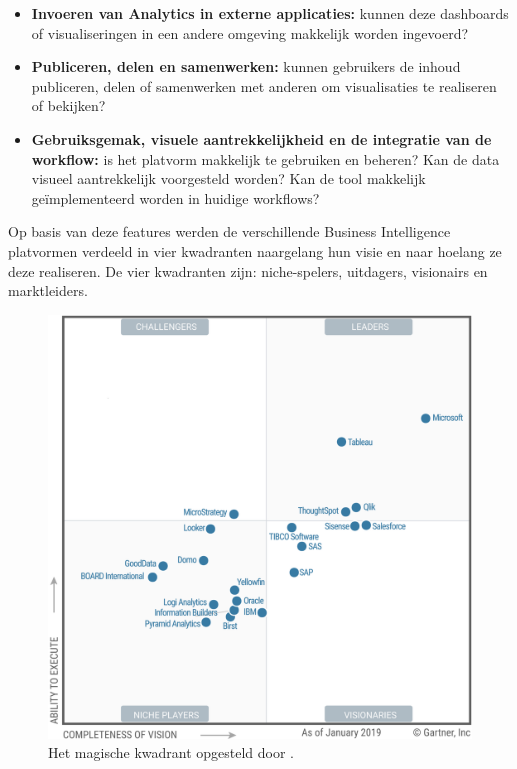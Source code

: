 \begin{itemize}
	\item \textbf{Invoeren van Analytics in externe applicaties:} kunnen deze dashboards of visualiseringen in een andere omgeving makkelijk worden ingevoerd?
	\item \textbf{Publiceren, delen en samenwerken: } kunnen gebruikers de inhoud publiceren, delen of samenwerken met anderen om visualisaties te realiseren of bekijken?
	\item \textbf{Gebruiksgemak, visuele aantrekkelijkheid en de integratie van de workflow:} is het platvorm makkelijk te gebruiken en beheren? Kan de data visueel aantrekkelijk voorgesteld worden? Kan de tool makkelijk geïmplementeerd worden in huidige workflows?
\end{itemize} 

Op basis van deze features werden de verschillende Business Intelligence platvormen verdeeld in vier kwadranten naargelang hun visie en naar hoelang ze deze realiseren. De vier kwadranten zijn: niche-spelers, uitdagers, visionairs en marktleiders.

\begin{figure}[h]
	\centering
	\includegraphics[scale=0.7]{../images/gartner.png}
	\caption{Het magische kwadrant opgesteld door \textcite{Gartner2019}.}
	\label{fig:dvmod}
\end{figure}

